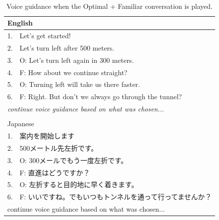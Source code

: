 \begin{table}[h]
\centering
\caption{Voice guidance when the Optimal + Familiar conversation is played.}~\label{tab:b-OF}
\begin{tabular}{ll}
\hline
\multicolumn{2}{l}{English}                                                            \\ \hline
1.                      & Let's get started!                                           \\
2.                      & Let's turn left after 500 meters.                            \\ \hline
\multicolumn{1}{|l}{3.} & \multicolumn{1}{l|}{O: Let's turn left again in 300 meters.} \\
\multicolumn{1}{|l}{4.} & \multicolumn{1}{l|}{F: How about we continue straight?}      \\
\multicolumn{1}{|l}{5.} & \multicolumn{1}{l|}{O: Turning left will take us there faster.}                       \\
\multicolumn{1}{|l}{6.} & \multicolumn{1}{l|}{F: Right. But don't we always go through the tunnel?}             \\ \hline
\multicolumn{2}{l}{\textit{continue voice guidance based on what was chosen...}}       \\
                        &                                                              \\ \hline
\multicolumn{2}{l}{Japanese}                                                           \\ \hline
1.                      & 案内を開始します                                                     \\
2.                      & 500メートル先左折です。                                                \\ \hline
\multicolumn{1}{|l}{3.} & \multicolumn{1}{l|}{O: 300メールでもう一度左折です。}                     \\
\multicolumn{1}{|l}{4.} & \multicolumn{1}{l|}{F: 直進はどうですか？}                            \\
\multicolumn{1}{|l}{5.} & \multicolumn{1}{l|}{O: 左折すると目的地に早く着きます。}                     \\
\multicolumn{1}{|l}{6.} & \multicolumn{1}{l|}{F: いいですね。でもいつもトンネルを通って行ってませんか？}          \\ \hline
\multicolumn{2}{l}{continue voice guidance based on what was chosen...}                \\

\end{tabular}
\end{table}
